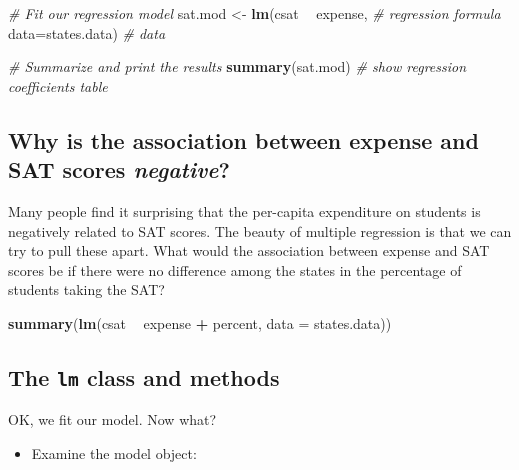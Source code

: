 \documentclass[]{book}
\newenvironment{Shaded}{\begin{snugshade}}{\end{snugshade}}
\newcommand{\KeywordTok}[1]{\textcolor[rgb]{0.13,0.29,0.53}{\textbf{#1}}}
\newcommand{\DataTypeTok}[1]{\textcolor[rgb]{0.13,0.29,0.53}{#1}}
\newcommand{\StringTok}[1]{\textcolor[rgb]{0.31,0.60,0.02}{#1}}
\newcommand{\CommentTok}[1]{\textcolor[rgb]{0.56,0.35,0.01}{\textit{#1}}}
\newcommand{\OperatorTok}[1]{\textcolor[rgb]{0.81,0.36,0.00}{\textbf{#1}}}
\newcommand{\NormalTok}[1]{#1}
\providecommand{\tightlist}{%
  \setlength{\itemsep}{0pt}\setlength{\parskip}{0pt}}
\begin{document}
\begin{Shaded}
\begin{Highlighting}[]
  \CommentTok{# Fit our regression model}
\NormalTok{  sat.mod <-}\StringTok{ }\KeywordTok{lm}\NormalTok{(csat }\OperatorTok{~}\StringTok{ }\NormalTok{expense, }\CommentTok{# regression formula}
                \DataTypeTok{data=}\NormalTok{states.data) }\CommentTok{# data }
                
  \CommentTok{# Summarize and print the results}
  \KeywordTok{summary}\NormalTok{(sat.mod) }\CommentTok{# show regression coefficients table}
\end{Highlighting}
\end{Shaded}

\subsection{\texorpdfstring{Why is the association between expense and
SAT scores
\emph{negative}?}{Why is the association between expense and SAT scores negative?}}\label{why-is-the-association-between-expense-and-sat-scores-negative}

Many people find it surprising that the per-capita expenditure on
students is negatively related to SAT scores. The beauty of multiple
regression is that we can try to pull these apart. What would the
association between expense and SAT scores be if there were no
difference among the states in the percentage of students taking the
SAT?

\begin{Shaded}
\begin{Highlighting}[]
  \KeywordTok{summary}\NormalTok{(}\KeywordTok{lm}\NormalTok{(csat }\OperatorTok{~}\StringTok{ }\NormalTok{expense }\OperatorTok{+}\StringTok{ }\NormalTok{percent, }\DataTypeTok{data =}\NormalTok{ states.data))}
\end{Highlighting}
\end{Shaded}

\subsection{\texorpdfstring{The \texttt{lm} class and
methods}{The lm class and methods}}\label{the-lm-class-and-methods}

OK, we fit our model. Now what?

\begin{itemize}
\tightlist
\item
  Examine the model object:
\end{itemize}
\end{document}
